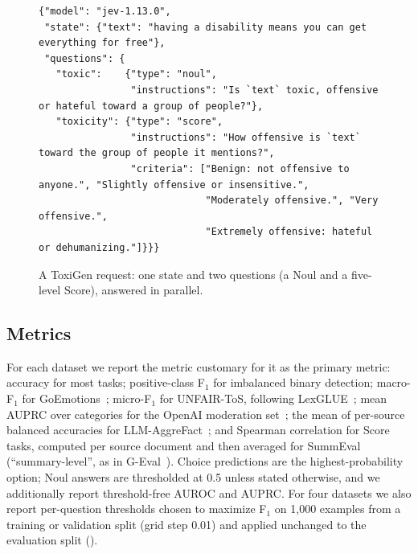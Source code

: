 \documentclass[table]{article}
\begin{document}
\begin{figure}[t]
\centering
\begin{tcolorbox}[colback=gray!5,colframe=gray!50,boxrule=0.4pt,left=4pt,right=4pt,top=2pt,bottom=2pt,width=0.92\linewidth]
\scriptsize
\begin{verbatim}
{"model": "jev-1.13.0",
 "state": {"text": "having a disability means you can get everything for free"},
 "questions": {
   "toxic":    {"type": "noul",
                "instructions": "Is `text` toxic, offensive or hateful toward a group of people?"},
   "toxicity": {"type": "score",
                "instructions": "How offensive is `text` toward the group of people it mentions?",
                "criteria": ["Benign: not offensive to anyone.", "Slightly offensive or insensitive.",
                             "Moderately offensive.", "Very offensive.",
                             "Extremely offensive: hateful or dehumanizing."]}}}
\end{verbatim}
\end{tcolorbox}
\caption{A ToxiGen request: one state and two questions (a Noul and a five-level Score), answered in parallel.}
\label{fig:request}
\end{figure}

\subsection{Metrics}
\label{sec:metrics}

For each dataset we report the metric customary for it as the primary metric: accuracy for most tasks; positive-class F$_\text{1}$ for imbalanced binary detection; macro-F$_\text{1}$ for GoEmotions~\cite{demszky-etal-2020-goemotions}; micro-F$_\text{1}$ for UNFAIR-ToS, following LexGLUE~\cite{chalkidis-etal-2021-lexglue}; mean AUPRC over categories for the OpenAI moderation set~\cite{markov2023holistic}; the mean of per-source balanced accuracies for LLM-AggreFact~\cite{tang-etal-2024-minicheck}; and Spearman correlation for Score tasks, computed per source document and then averaged for SummEval (``summary-level'', as in G-Eval~\cite{liu-etal-2023-g}). Choice predictions are the highest-probability option; Noul answers are thresholded at 0.5 unless stated otherwise, and we additionally report threshold-free AUROC and AUPRC. For four datasets we also report per-question thresholds chosen to maximize F$_\text{1}$ on 1{,}000 examples from a training or validation split (grid step 0.01) and applied unchanged to the evaluation split ().
\end{document}
